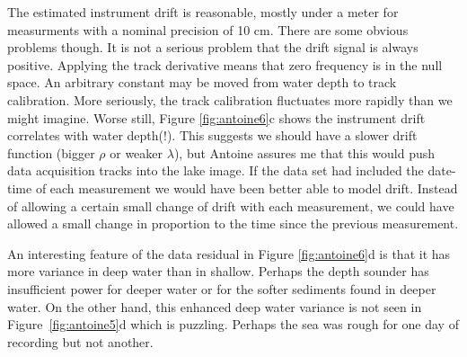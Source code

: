 
\par
The estimated instrument drift is reasonable, mostly under a meter
for measurments with a nominal precision of 10 cm.
There are some obvious problems though.
It is not a serious problem that the drift signal is always positive.
Applying the track derivative means that zero frequency is in the null space.
An arbitrary constant may be moved
from water depth to track calibration.
More seriously, the track calibration fluctuates
more rapidly than we might imagine.
Worse still, Figure \ref{fig:antoine6}c shows
the instrument drift correlates with water depth(!).
This suggests we should have a slower drift function
(bigger $\rho$ or weaker $\lambda$), but Antoine assures me that
this would push data acquisition tracks into the lake image.
If the data set had included the date-time of each measurement
we would have been better able to model drift.
Instead of allowing a certain small change of drift with each measurement,
we could have allowed a small change
in proportion to the time since the previous measurement.

\par
An interesting feature of the data residual in Figure \ref{fig:antoine6}d is
that it has more variance in deep water than in shallow.
Perhaps the depth sounder has insufficient power for deeper water
or for the softer sediments found in deeper water.
On the other hand, this enhanced deep water variance
is not seen in Figure~\ref{fig:antoine5}d which is puzzling.
Perhaps the sea was rough for one day of recording but not another.




















